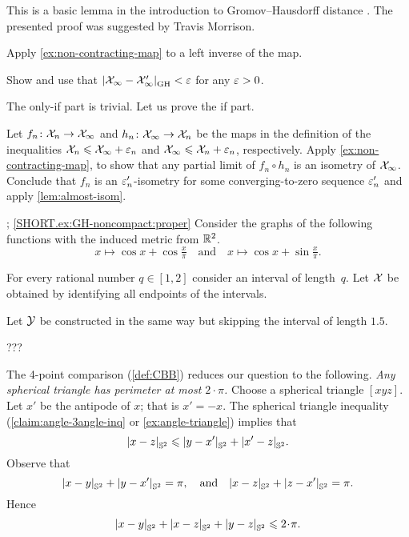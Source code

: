 This is a basic lemma in the introduction to Gromov--Hausdorff distance \cite[see 7.3.30 in][]{burago-burago-ivanov}.
The presented proof was suggested by Travis Morrison.

Apply \ref{ex:non-contracting-map} to a left inverse of the map.


 Show and use that $|{\mathcal{X}_\infty}-{\mathcal{X}_\infty'}|_{\operatorname{\rm GH}\nolimits}^{{}}<\varepsilon$ for any $\varepsilon>0$.

The only-if part is trivial.
Let us prove the if part.

Let $f_n\colon\mathcal{X}_n\to \mathcal{X}_\infty$ and $h_n\colon\mathcal{X}_\infty\to \mathcal{X}_n$ be the maps in the definition of the inequalities $\mathcal{X}_n\leqslant \mathcal{X}_\infty+\varepsilon_n$ and $\mathcal{X}_\infty\leqslant \mathcal{X}_n+\varepsilon_n$, respectively.
Apply \ref{ex:non-contracting-map}, to show that any partial limit of $f_n\circ h_n$ is an isometry of $\mathcal{X}_\infty$.
Conclude that $f_n$ is an $\varepsilon_n'$-isometry for some converging-to-zero sequence $\varepsilon_n'$ and apply \ref{lem:almost-isom}.

\parbf{\ref{ex:GH-noncompact}}; \ref{SHORT.ex:GH-noncompact:proper}
 Consider the graphs of the following functions with the induced metric from $\mathbb{R}^2$.
\[
x\mapsto \cos x+\cos \tfrac x\pi
\quad\text{and}\quad
x\mapsto \cos x+\sin \tfrac x\pi.
\]


\parit{\ref{SHORT.ex:GH-noncompact:bounded}}
For every rational number  $q\in[1,2]$ consider an interval of length~$q$.
Let $\mathcal{X}$ be obtained by identifying all endpoints of the intervals.

Let $\mathcal{Y}$ be constructed in the same way but skipping the interval of length $1.5$.

 ???

The 4-point comparison (\ref{def:CBB}) reduces our question to the following.
\textit{Any spherical triangle has perimeter at most $2\cdot\pi$.}
Choose a spherical triangle $[xyz]$.
Let $x'$ be the antipode of $x$; that is $x'=-x$.
The spherical triangle inequality (\ref{claim:angle-3angle-inq} or \ref{ex:angle-triangle}) implies that
\[|{x}-{z}|_{\mathbb{S}^2}^{{}}\leqslant |{y}-{x'}|_{\mathbb{S}^2}^{{}}+|{x'}-{z}|_{\mathbb{S}^2}^{{}}.\]
Observe that 
\[
|{x}-{y}|_{\mathbb{S}^2}^{{}}+|{y}-{x'}|_{\mathbb{S}^2}^{{}}=\pi,
\quad\text{and}\quad
|{x}-{z}|_{\mathbb{S}^2}^{{}}+|{z}-{x'}|_{\mathbb{S}^2}^{{}}=\pi.
\]
Hence
\[\dist{x}{y}{\mathbb{S}^2}+\dist{x}{z}{\mathbb{S}^2}+\dist{y}{z}{\mathbb{S}^2}\le2\cdot \pi.\]

